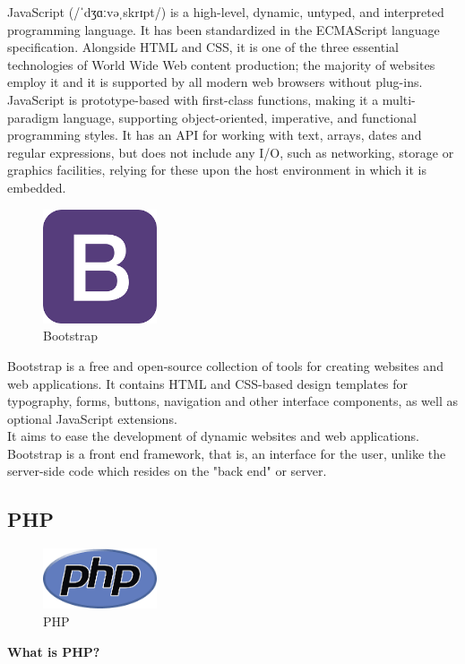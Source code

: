 JavaScript (/ˈdʒɑːvəˌskrɪpt/) is a high-level, dynamic, untyped, and interpreted programming language. It has been standardized in the ECMAScript language specification. Alongside HTML and CSS, it is one of the three essential technologies of World Wide Web content production; the majority of websites employ it and it is supported by all modern web browsers without plug-ins. JavaScript is prototype-based with first-class functions, making it a multi-paradigm language, supporting object-oriented, imperative, and functional programming styles. It has an API for working with text, arrays, dates and regular expressions, but does not include any I/O, such as networking, storage or graphics facilities, relying for these upon the host environment in which it is embedded.


\begin{figure}[!ht]
	\centering
	\includegraphics[width=0.3\textwidth]{input/images/bootstrap.png}
	\caption{Bootstrap}
	\hspace{-1.5em}
\end{figure}

Bootstrap is a free and open-source collection of tools for creating websites and web applications. It
contains HTML and CSS-based design templates for typography, forms, buttons, navigation and other
interface components, as well as optional JavaScript extensions.\\
It aims to ease the development of dynamic websites and web applications.\\
Bootstrap is a front end framework, that is, an interface for the user, unlike the server-side code which
resides on the "back end" or server.


\iffalse
\subsection{PHP}
\begin{figure}[!ht]
\centering
\includegraphics[width=0.3\textwidth]{input/images/php.png}
\caption{PHP}
\hspace{-1.5em}
\end{figure}
 {\bf What is PHP?}

